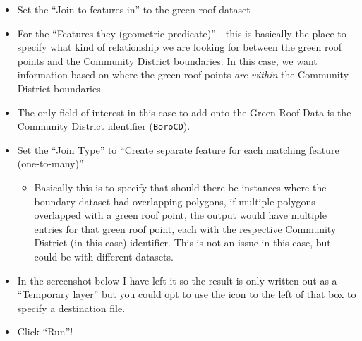\documentclass[
  letterpaper,
  DIV=11,
  numbers=noendperiod]{scrreprt}
\providecommand{\tightlist}{%
  \setlength{\itemsep}{0pt}\setlength{\parskip}{0pt}}\usepackage{longtable,booktabs,array}
\begin{document}
\begin{itemize}
\tightlist
\item
  Set the ``Join to features in'' to the green roof dataset
\item
  For the ``Features they (geometric predicate)'' - this is basically
  the place to specify what kind of relationship we are looking for
  between the green roof points and the Community District boundaries.
  In this case, we want information based on where the green roof points
  \emph{are within} the Community District boundaries.
\item
  The only field of interest in this case to add onto the Green Roof
  Data is the Community District identifier (\texttt{BoroCD}).
\item
  Set the ``Join Type'' to ``Create separate feature for each matching
  feature (one-to-many)''

  \begin{itemize}
  \tightlist
  \item
    Basically this is to specify that should there be instances where
    the boundary dataset had overlapping polygons, if multiple polygons
    overlapped with a green roof point, the output would have multiple
    entries for that green roof point, each with the respective
    Community District (in this case) identifier. This is not an issue
    in this case, but could be with different datasets.
  \end{itemize}
\item
  In the screenshot below I have left it so the result is only written
  out as a ``Temporary layer'' but you could opt to use the icon to the
  left of that box to specify a destination file.
\item
  Click ``Run''!
\end{itemize}
\end{document}
